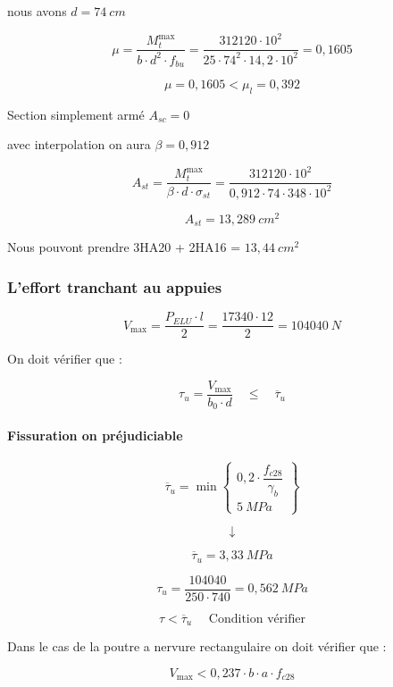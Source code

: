 \documentclass[12pt,a4paper]{article}
\begin{document}
	nous avons $ d = 74 ~\unit{cm} $
	
	\[ \mu = \dfrac{M_{t}^{\max}}{b \cdot d^{2} \cdot f_{bu}} = \dfrac{312120 \cdot 10^{2}}{25 \cdot 74^{2} \cdot 14,2 \cdot 10^{2}} = 0,1605 \]
	
	\[ \mu = 0,1605 < \mu_{l} = 0,392 \] 
	
	Section simplement armé $ A_{sc} = 0 $
	
	avec interpolation on aura $ \beta  = 0,912 $
	
	\[ A_{st} = \dfrac{M_{t}^{\max}}{\beta \cdot d \cdot \sigma_{st}} = \dfrac{312120 \cdot 10^{2}}{0,912 \cdot 74 \cdot 348 \cdot 10^{2}} \]
	
	\[ A_{st} = 13,289 ~\unit{cm^{2}} \]
	
	Nous pouvont prendre 3HA20 + 2HA16  = $13,44 ~\unit{cm^{2}}$
	
	
	\subsubsection{L'effort tranchant au appuies}
	
	\[ V_{\max} = \dfrac{P_{ELU} \cdot l}{2}  = \dfrac{17340 \cdot 12}{2} = 104040 ~\unit{N} \]
	
	On doit vérifier que :
	
	\[ \tau_{u} = \dfrac{V_{\max}}{b_{0} \cdot d} \quad\leq\quad \overline{\tau}_{u} \]
	
	\paragraph{Fissuration on préjudiciable}
	
	\[ \overline{\tau}_{u} = \min \left.\begin{cases}
		0,2 \cdot \dfrac{f_{c28}}{\gamma_{b}} \\
		5 ~\unit{MPa}
	\end{cases}\right\} \]
	
	\[ \downarrow \]
	
	\[ \overline{\tau}_{u} = 3,33 ~\unit{MPa} \]
	
	\[ \tau_{u} = \dfrac{104040}{250 \cdot 740} = 0,562 ~\unit{MPa} \]
	
	\[ \tau < \overline{\tau}_{u} \quad \text{ Condition vérifier} \]

	\vspace{4\baselineskip}

	Dans le cas de la poutre a nervure rectangulaire on doit vérifier que :
	
	\[ V_{\max} < 0,237 \cdot b \cdot a \cdot f_{c28} \]
	
\end{document}

